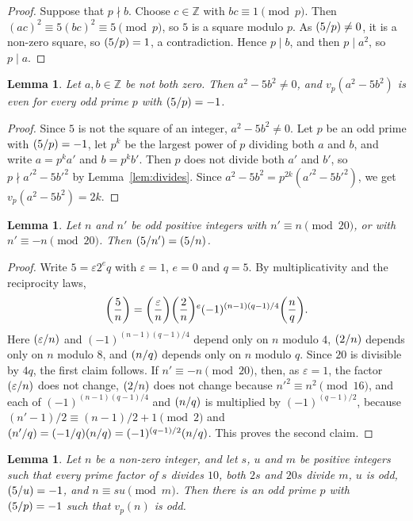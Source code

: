\documentclass[11pt]{article}
\newtheorem{lemma}[theorem]{Lemma}
\newcommand{\Z}{\mathbb{Z}}
\newcommand{\leg}[2]{\mathchoice{\biggl(\dfrac{#1}{#2}\biggr)}{(#1/#2)}{(#1/#2)}{(#1/#2)}}
\begin{document}
\begin{proof}
Suppose that $p\nmid b$. Choose $c\in\Z$ with $bc\equiv1\pmod p$. Then $(ac)^2\equiv5(bc)^2\equiv5\pmod p$, so $5$ is a square modulo $p$. As $\leg{5}{p}\neq0$, it is a non-zero square, so $\leg{5}{p}=1$, a contradiction. Hence $p\mid b$, and then $p\mid a^2$, so $p\mid a$.
\end{proof}

\begin{lemma}\label{lem:even}
Let $a,b\in\Z$ be not both zero. Then $a^2-5b^2\neq0$, and $v_p(a^2-5b^2)$ is even for every odd prime $p$ with $\leg{5}{p}=-1$.
\end{lemma}

\begin{proof}
Since $5$ is not the square of an integer, $a^2-5b^2\neq0$. Let $p$ be an odd prime with $\leg{5}{p}=-1$, let $p^k$ be the largest power of $p$ dividing both $a$ and $b$, and write $a=p^ka'$ and $b=p^kb'$. Then $p$ does not divide both $a'$ and $b'$, so $p\nmid a'^2-5b'^2$ by Lemma~\ref{lem:divides}. Since $a^2-5b^2=p^{2k}(a'^2-5b'^2)$, we get $v_p(a^2-5b^2)=2k$.
\end{proof}

\begin{lemma}\label{lem:period}
Let $n$ and $n'$ be odd positive integers with $n'\equiv n\pmod{20}$, or with $n'\equiv-n\pmod{20}$. Then $\leg{5}{n'}=\leg{5}{n}$.
\end{lemma}

\begin{proof}
Write $5=\varepsilon2^eq$ with $\varepsilon=1$, $e=0$ and $q=5$. By multiplicativity and the reciprocity laws,
\[
\leg{5}{n}=\leg{\varepsilon}{n}\leg{2}{n}^e(-1)^{(n-1)(q-1)/4}\leg{n}{q}.
\]
Here $\leg{\varepsilon}{n}$ and $(-1)^{(n-1)(q-1)/4}$ depend only on $n$ modulo $4$, $\leg{2}{n}$ depends only on $n$ modulo $8$, and $\leg{n}{q}$ depends only on $n$ modulo $q$. Since $20$ is divisible by $4q$, the first claim follows. If $n'\equiv-n\pmod{20}$, then, as $\varepsilon=1$, the factor $\leg{\varepsilon}{n}$ does not change, $\leg{2}{n}$ does not change because $n'^2\equiv n^2\pmod{16}$, and each of $(-1)^{(n-1)(q-1)/4}$ and $\leg{n}{q}$ is multiplied by $(-1)^{(q-1)/2}$, because $(n'-1)/2\equiv(n-1)/2+1\pmod 2$ and $\leg{n'}{q}=\leg{-1}{q}\leg{n}{q}=(-1)^{(q-1)/2}\leg{n}{q}$. This proves the second claim.
\end{proof}

\begin{lemma}\label{lem:odd}
Let $n$ be a non-zero integer, and let $s$, $u$ and $m$ be positive integers such that every prime factor of $s$ divides $10$, both $2s$ and $20s$ divide $m$, $u$ is odd, $\leg{5}{u}=-1$, and $n\equiv su\pmod m$. Then there is an odd prime $p$ with $\leg{5}{p}=-1$ such that $v_p(n)$ is odd.
\end{lemma}
\end{document}
